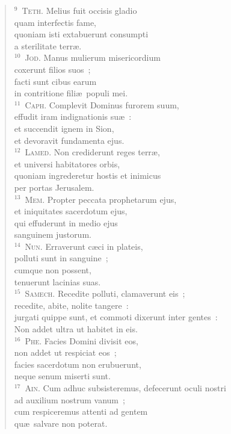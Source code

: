 \begin{flushleft}
\begin{verse}
${}^{9}$~\textsc{Teth.} Melius fuit occisis gladio\\ quam interfectis fame,\\ quoniam isti extabuerunt consumpti\\ a sterilitate terr\ae .\\
${}^{10}$~\textsc{Jod.} Manus mulierum misericordium\\ coxerunt filios suos~;\\ facti sunt cibus earum\\ in contritione fili\ae\ populi mei.\\
${}^{11}$~\textsc{Caph.} Complevit Dominus furorem suum,\\ effudit iram indignationis su\ae~:\\ et succendit ignem in Sion,\\ et devoravit fundamenta ejus.\\
${}^{12}$~\textsc{Lamed.} Non crediderunt reges terr\ae ,\\ et universi habitatores orbis,\\ quoniam ingrederetur hostis et inimicus\\ per portas Jerusalem.\\
${}^{13}$~\textsc{Mem.} Propter peccata prophetarum ejus,\\ et iniquitates sacerdotum ejus,\\ qui effuderunt in medio ejus\\ sanguinem justorum.\\
${}^{14}$~\textsc{Nun.} Erraverunt c\ae ci in plateis,\\ polluti sunt in sanguine~;\\ cumque non possent,\\ tenuerunt lacinias suas.\\
${}^{15}$~\textsc{Samech.} Recedite polluti, clamaverunt eis~;\\ recedite, abite, nolite tangere~:\\ jurgati quippe sunt, et commoti dixerunt inter gentes~:\\ Non addet ultra ut habitet in eis.\\
${}^{16}$~\textsc{Phe.} Facies Domini divisit eos,\\ non addet ut respiciat eos~;\\ facies sacerdotum non erubuerunt,\\ neque senum miserti sunt.\\
${}^{17}$~\textsc{Ain.} Cum adhuc subsisteremus, defecerunt oculi nostri\\ ad auxilium nostrum vanum~;\\ cum respiceremus attenti ad gentem\\ qu\ae\ salvare non poterat.\\

\end{verse}
\end{flushleft}
